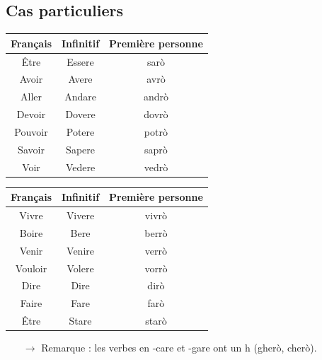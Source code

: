 \documentclass[12pt, openany]{report}
\begin{document}
\subsection{Cas particuliers}
\begin{minipage}{.478\textwidth}
    \begin{center}
        \begin{tabular}{c|c|c}
            Français & Infinitif & Première personne \\ \hline 
            Être & Essere & sarò\\ 
            Avoir & Avere & avrò\\
            Aller & Andare & andrò\\
            Devoir & Dovere & dovrò\\
            Pouvoir & Potere & potrò\\
            Savoir & Sapere & saprò\\
            Voir & Vedere & vedrò\\
            
        \end{tabular}
    \end{center}
\end{minipage}
\begin{minipage}{.478\textwidth}
    \begin{center}
        \begin{tabular}{c|c|c}
            Français & Infinitif & Première personne \\ \hline
            Vivre & Vivere & vivrò\\
            Boire & Bere & berrò\\
            Venir & Venire & verrò\\ 
            Vouloir & Volere & vorrò\\
            Dire & Dire & dirò\\
            Faire & Fare & farò\\
            Être & Stare & starò\\
        \end{tabular}
    \end{center}
\end{minipage}
\begin{itemize}
    \item [$\to$] Remarque : les verbes en -care et -gare ont un h (gherò, cherò).
\end{itemize}
\end{document}
